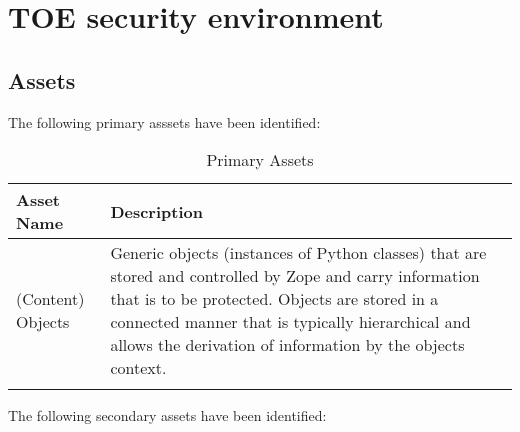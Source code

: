 \documentclass[12pt,english]{scrbook}
\begin{document}



\chapter{TOE security environment}





\section{Assets}

The following primary asssets have been identified:

\begin{longtable}[c]{lp{10cm}}
  \toprule 
  Asset Name & Description \\
  \midrule\endhead

  (Content) Objects & 
  Generic objects (instances of Python classes) that
  are stored and controlled by Zope and carry
  information that is to be protected. Objects are
  stored in a connected manner that is typically
  hierarchical and allows the derivation of
  information by the objects context. \\
  \bottomrule
  \caption{Primary Assets}
  \label{tab-assets}
\end{longtable}

The following secondary assets have been identified:
\end{document}
